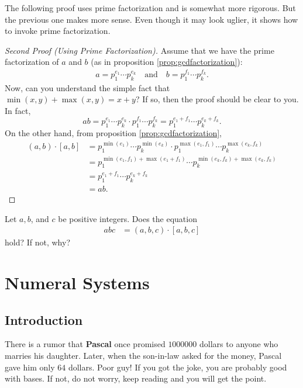 \documentclass{subfile}
\begin{document}
	The following proof uses prime factorization and is somewhat more rigorous. But the previous one makes more sense. Even though it may look uglier, it shows how to invoke prime factorization.
	\begin{proof}[Second Proof (Using Prime Factorization)]
		Assume that we have the prime factorization of $a$ and $b$ (as in proposition \eqref{prop:gcdfactorization}):
		\begin{align*}
			a =p_1^{e_1}\cdots p_k^{e_k} \quad \text{and} \quad b =p_1^{f_1}\cdots p_k^{f_k}.
		\end{align*}
		Now, can you understand the simple fact that $\min(x,y)+\max(x,y)=x+y$? If so, then the proof should be clear to you. In fact,
		\[ab=p_1^{e_1}\cdots p_k^{e_k}\cdot p_1^{f_1}\cdots p_k^{f_k}=p_1^{e_1+f_1}\cdots p_k^{e_k+f_k}.\]
		On the other hand, from proposition \eqref{prop:gcdfactorization},
		\begin{align*}
			(a,b)\cdot[a,b]
			& = p_1^{\min(e_1)}\cdots p_k^{\min(e_k)}\cdot p_1^{\max(e_1,f_1)}\cdots p_k^{\max(e_k,f_k)}\\
			& = p_1^{\min(e_1,f_1)+\max(e_1+f_1)}\cdots p_k^{\min(e_k,f_k)+\max(e_k,f_k)}\\
			& = p_1^{e_1+f_1}\cdots p_k^{e_k+f_k}\\
			& = ab.
		\end{align*}
	\end{proof}

	\begin{question}
		Let $a,b$, and $c$ be positive integers. Does the equation
			\begin{align*}
				abc
					& =(a,b,c)\cdot[a,b,c]
			\end{align*}
		hold? If not, why?
	\end{question}

	\section{Numeral Systems}
	\subsection{Introduction}
	There is a rumor that \textbf{Pascal} once promised $1000000$ dollars to anyone who marries his daughter. Later, when the son-in-law asked for the money, Pascal gave him only $64$ dollars. Poor guy! If you got the joke, you are probably good with bases. If not, do not worry, keep reading and you will get the point.
\end{document}
